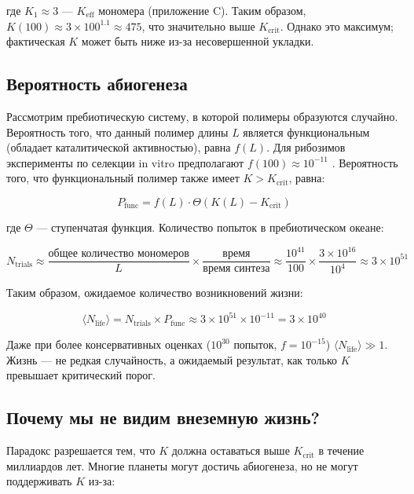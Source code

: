 \documentclass[12pt,a4paper]{article}
\theoremstyle{remark}
\newcommand{\Keff}{K_{\mathrm{eff}}}
\newcommand{\Keffcrit}{K_{\mathrm{crit}}}
\newcommand{\Ntrials}{N_{\mathrm{trials}}}
\newcommand{\Nlife}{\langle N_{\mathrm{life}}\rangle}
\begin{document}
	где $K_1 \approx 3$ — $\Keff$ мономера (приложение C). Таким образом, $K(100) \approx 3 \times 100^{1.1} \approx 475$, что значительно выше $K_{\text{crit}}$. Однако это максимум; фактическая $K$ может быть ниже из-за несовершенной укладки.
	
	\subsection{Вероятность абиогенеза}
	
	Рассмотрим пребиотическую систему, в которой полимеры образуются случайно. Вероятность того, что данный полимер длины $L$ является функциональным (обладает каталитической активностью), равна $f(L)$. Для рибозимов эксперименты по селекции in vitro предполагают $f(100) \approx 10^{-11}$ \cite{Joyce2002}. Вероятность того, что функциональный полимер также имеет $K > K_{\text{crit}}$, равна:
	
	\begin{equation}
		P_{\text{func}} = f(L) \cdot \Theta(K(L) - K_{\text{crit}})
		\label{eq:Pfunc}
	\end{equation}
	
	где $\Theta$ — ступенчатая функция. Количество попыток в пребиотическом океане:
	
	\begin{equation}
		\Ntrials \approx \frac{\text{общее количество мономеров}}{L} \times \frac{\text{время}}{\text{время синтеза}} \approx \frac{10^{41}}{100} \times \frac{3\times 10^{16}}{10^4} \approx 3 \times 10^{51}
		\label{eq:trials}
	\end{equation}
	
	Таким образом, ожидаемое количество возникновений жизни:
	
	\begin{equation}
		\Nlife = \Ntrials \times P_{\text{func}} \approx 3 \times 10^{51} \times 10^{-11} = 3 \times 10^{40}
		\label{eq:Nlife}
	\end{equation}
	
	Даже при более консервативных оценках ($10^{30}$ попыток, $f=10^{-15}$) $\Nlife \gg 1$. Жизнь — не редкая случайность, а ожидаемый результат, как только $K$ превышает критический порог.
	
	\subsection{Почему мы не видим внеземную жизнь?}
	
	Парадокс разрешается тем, что $K$ должна оставаться выше $\Keffcrit$ в течение миллиардов лет. Многие планеты могут достичь абиогенеза, но не могут поддерживать $K$ из-за:
	
\end{document}
